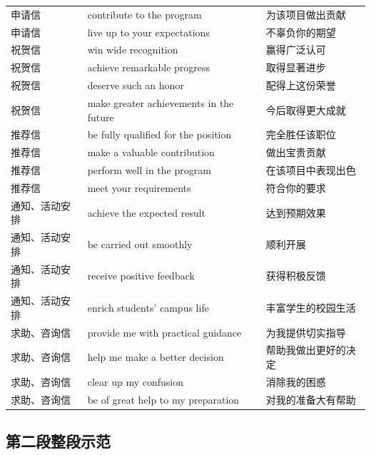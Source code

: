 \documentclass[11pt,a4paper]{ctexart}
\begin{document}
\begin{longtable}{L{1.8cm}L{9.5cm}L{4.4cm}}
申请信 & contribute to the program & 为该项目做出贡献 \\
申请信 & live up to your expectations & 不辜负你的期望 \\
\midrule
祝贺信 & win wide recognition & 赢得广泛认可 \\
祝贺信 & achieve remarkable progress & 取得显著进步 \\
祝贺信 & deserve such an honor & 配得上这份荣誉 \\
祝贺信 & make greater achievements in the future & 今后取得更大成就 \\
\midrule
推荐信 & be fully qualified for the position & 完全胜任该职位 \\
推荐信 & make a valuable contribution & 做出宝贵贡献 \\
推荐信 & perform well in the program & 在该项目中表现出色 \\
推荐信 & meet your requirements & 符合你的要求 \\
\midrule
通知、活动安排 & achieve the expected result & 达到预期效果 \\
通知、活动安排 & be carried out smoothly & 顺利开展 \\
通知、活动安排 & receive positive feedback & 获得积极反馈 \\
通知、活动安排 & enrich students' campus life & 丰富学生的校园生活 \\
\midrule
求助、咨询信 & provide me with practical guidance & 为我提供切实指导 \\
求助、咨询信 & help me make a better decision & 帮助我做出更好的决定 \\
求助、咨询信 & clear up my confusion & 消除我的困惑 \\
求助、咨询信 & be of great help to my preparation & 对我的准备大有帮助 \\

\end{longtable}


\subsection{第二段整段示范}
\end{document}
